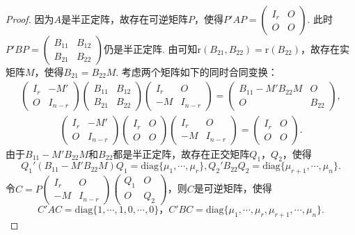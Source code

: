 \documentclass[../../main.tex]{subfiles}
\begin{document}
\begin{proof}
因为\(A\)是半正定阵，故存在可逆矩阵\(P\)，使得\(P'AP=\begin{pmatrix}I_r&O\\O&O\end{pmatrix}\). 此时\(P'BP=\begin{pmatrix}B_{11}&B_{12}\\B_{21}&B_{22}\end{pmatrix}\)仍是半正定阵. 由可知\(\mathrm{r}(B_{21},B_{22})=\mathrm{r}(B_{22})\)，故存在实矩阵\(M\)，使得\(B_{21}=B_{22}M\). 考虑两个矩阵如下的同时合同变换：
\begin{align*}
\begin{pmatrix}I_r&-M'\\O&I_{n - r}\end{pmatrix}\begin{pmatrix}B_{11}&B_{12}\\B_{21}&B_{22}\end{pmatrix}\begin{pmatrix}I_r&O\\-M&I_{n - r}\end{pmatrix}=\begin{pmatrix}B_{11}-M'B_{22}M&O\\O&B_{22}\end{pmatrix},
\end{align*}
\begin{align*}
\begin{pmatrix}I_r&-M'\\O&I_{n - r}\end{pmatrix}\begin{pmatrix}I_r&O\\O&O\end{pmatrix}\begin{pmatrix}I_r&O\\-M&I_{n - r}\end{pmatrix}=\begin{pmatrix}I_r&O\\O&O\end{pmatrix}.
\end{align*}
由于\(B_{11}-M'B_{22}M\)和\(B_{22}\)都是半正定阵，故存在正交矩阵\(Q_1\)，\(Q_2\)，使得
\[
Q_1'(B_{11}-M'B_{22}M)Q_1 = \mathrm{diag}\{\mu_1,\cdots,\mu_r\},
Q_2'B_{22}Q_2 = \mathrm{diag}\{\mu_{r + 1},\cdots,\mu_n\}.
\]
令\(C = P\begin{pmatrix}I_r&O\\-M&I_{n - r}\end{pmatrix}\begin{pmatrix}Q_1&O\\O&Q_2\end{pmatrix}\)，则\(C\)是可逆矩阵，使得
\[
C'AC = \mathrm{diag}\{1,\cdots,1,0,\cdots,0\}，
C'BC = \mathrm{diag}\{\mu_1,\cdots,\mu_r,\mu_{r + 1},\cdots,\mu_n\}. 
\]

\end{proof}
\end{document}
